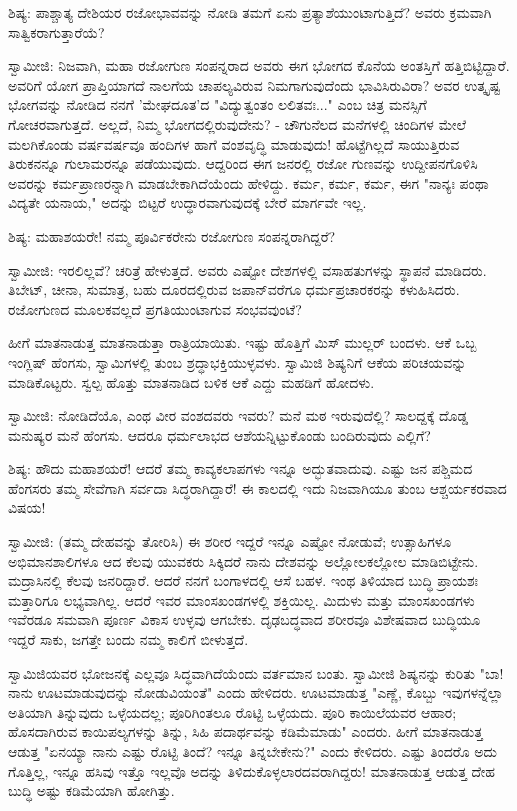 ಶಿಷ್ಯ: ಪಾಶ್ಚಾತ್ಯ ದೇಶಿಯರ ರಜೋಭಾವವನ್ನು ನೋಡಿ ತಮಗೆ ಏನು ಪ್ರತ್ಯಾಶೆಯುಂಟಾಗುತ್ತಿದೆ? ಅವರು ಕ್ರಮವಾಗಿ ಸಾತ್ವಿಕರಾಗುತ್ತಾರೆಯೆ?

ಸ್ವಾಮೀಜಿ: ನಿಜವಾಗಿ, ಮಹಾ ರಜೋಗುಣ ಸಂಪನ್ನರಾದ ಅವರು ಈಗ ಭೋಗದ ಕೊನೆಯ ಅಂತಸ್ತಿಗೆ ಹತ್ತಿಬಿಟ್ಟಿದ್ದಾರೆ. ಅವರಿಗೆ ಯೋಗ ಪ್ರಾಪ್ತಿಯಾಗದೆ ನಾಲಗೆಯ ಚಾಪಲ್ಯವಿರುವ ನಿಮಗಾಗುವುದೆಂದು ಭಾವಿಸಿರುವಿರಾ? ಅವರ ಉತ್ಕೃಷ್ಟ ಭೋಗವನ್ನು ನೋಡಿದ ನನಗೆ 'ಮೇಘದೂತ'ದ "ವಿದ್ಯುತ್ವಂತಂ ಲಲಿತವಃ..." ಎಂಬ ಚಿತ್ರ ಮನಸ್ಸಿಗೆ ಗೋಚರವಾಗುತ್ತದೆ. ಅಲ್ಲದೆ, ನಿಮ್ಮ ಭೋಗದಲ್ಲಿರುವುದೇನು? - ಚೌಗುನೆಲದ ಮನೆಗಳಲ್ಲಿ ಚಿಂದಿಗಳ ಮೇಲೆ ಮಲಗಿಕೊಂಡು ವರ್ಷವರ್ಷವೂ ಹಂದಿಗಳ ಹಾಗೆ ವಂಶವೃದ್ಧಿ ಮಾಡುವುದು! ಹೊಟ್ಟೆಗಿಲ್ಲದೆ ಸಾಯುತ್ತಿರುವ ತಿರುಕನನ್ನೂ ಗುಲಾಮರನ್ನೂ ಪಡೆಯುವುದು. ಆದ್ದರಿಂದ ಈಗ ಜನರಲ್ಲಿ ರಜೋ ಗುಣವನ್ನು ಉದ್ದೀಪನಗೊಳಿಸಿ ಅವರನ್ನು ಕರ್ಮಪ್ರಾಣರನ್ನಾಗಿ ಮಾಡಬೇಕಾಗಿದೆಯೆಂದು ಹೇಳಿದ್ದು. ಕರ್ಮ, ಕರ್ಮ, ಕರ್ಮ, ಈಗ "ನಾನ್ಯಃ ಪಂಥಾ ವಿದ್ಯತೇ ಯನಾಯ," ಅದನ್ನು ಬಿಟ್ಟರೆ ಉದ್ಧಾರವಾಗುವುದಕ್ಕೆ ಬೇರೆ ಮಾರ್ಗವೇ ಇಲ್ಲ.

ಶಿಷ್ಯ: ಮಹಾಶಯರೇ! ನಮ್ಮ ಪೂರ್ವಿಕರೇನು ರಜೋಗುಣ ಸಂಪನ್ನರಾಗಿದ್ದರೆ?

ಸ್ವಾಮೀಜಿ: ಇರಲಿಲ್ಲವೆ? ಚರಿತ್ರೆ ಹೇಳುತ್ತದೆ. ಅವರು ಎಷ್ಟೋ ದೇಶಗಳಲ್ಲಿ ವಸಾಹತುಗಳನ್ನು ಸ್ಥಾಪನೆ ಮಾಡಿದರು. ತಿಬೇಟ್, ಚೀನಾ, ಸುಮಾತ್ರ, ಬಹು ದೂರದಲ್ಲಿರುವ ಜಪಾನ್‌ವರೆಗೂ ಧರ್ಮಪ್ರಚಾರಕರನ್ನು ಕಳುಹಿಸಿದರು. ರಜೋಗುಣದ ಮೂಲಕವಲ್ಲದೆ ಪ್ರಗತಿಯುಂಟಾಗುವ ಸಂಭವವುಂಟೆ?

ಹೀಗೆ ಮಾತನಾಡುತ್ತ ಮಾತನಾಡುತ್ತಾ ರಾತ್ರಿಯಾಯಿತು. ಇಷ್ಟು ಹೊತ್ತಿಗೆ ಮಿಸ್ ಮುಲ್ಲರ್ ಬಂದಳು. ಆಕೆ ಒಬ್ಬ ಇಂಗ್ಲಿಷ್ ಹೆಂಗಸು, ಸ್ವಾಮಿಗಳಲ್ಲಿ ತುಂಬ ಶ್ರದ್ಧಾಭಕ್ತಿಯುಳ್ಳವಳು. ಸ್ವಾಮಿಜಿ ಶಿಷ್ಯನಿಗೆ ಆಕೆಯ ಪರಿಚಯವನ್ನು ಮಾಡಿಕೊಟ್ಟರು. ಸ್ವಲ್ಪ ಹೊತ್ತು ಮಾತನಾಡಿದ ಬಳಿಕ ಆಕೆ ಎದ್ದು ಮಹಡಿಗೆ ಹೋದಳು.

ಸ್ವಾಮೀಜಿ: ನೋಡಿದೆಯೊ, ಎಂಥ ವೀರ ವಂಶದವರು ಇವರು? ಮನೆ ಮಠ ಇರುವುದೆಲ್ಲಿ? ಸಾಲದ್ದಕ್ಕೆ ದೊಡ್ಡ ಮನುಷ್ಯರ ಮನೆ ಹೆಂಗಸು. ಆದರೂ ಧರ್ಮಲಾಭದ ಆಶೆಯನ್ನಿಟ್ಟುಕೊಂಡು ಬಂದಿರುವುದು ಎಲ್ಲಿಗೆ?

ಶಿಷ್ಯ: ಹೌದು ಮಹಾಶಯರೆ! ಆದರೆ ತಮ್ಮ ಕಾವ್ಯಕಲಾಪಗಳು ಇನ್ನೂ ಅದ್ಭುತವಾದುವು. ಎಷ್ಟು ಜನ ಪಶ್ಚಿಮದ ಹೆಂಗಸರು ತಮ್ಮ ಸೇವೆಗಾಗಿ ಸರ್ವದಾ ಸಿದ್ಧರಾಗಿದ್ದಾರೆ! ಈ ಕಾಲದಲ್ಲಿ ಇದು ನಿಜವಾಗಿಯೂ ತುಂಬ ಆಶ್ಚರ್ಯಕರವಾದ ವಿಷಯ!

ಸ್ವಾಮೀಜಿ: (ತಮ್ಮ ದೇಹವನ್ನು ತೋರಿಸಿ) ಈ ಶರೀರ ಇದ್ದರೆ ಇನ್ನೂ ಎಷ್ಟೋ ನೋಡುವೆ; ಉತ್ಸಾಹಿಗಳೂ ಅಭಿಮಾನಶಾಲಿಗಳೂ ಆದ ಕೆಲವು ಯುವಕರು ಸಿಕ್ಕಿದರೆ ನಾನು ದೇಶವನ್ನು ಅಲ್ಲೋಲಕಲ್ಲೋಲ ಮಾಡಿಬಿಟ್ಟೇನು. ಮದ್ರಾಸಿನಲ್ಲಿ ಕೆಲವು ಜನರಿದ್ದಾರೆ. ಆದರೆ ನನಗೆ ಬಂಗಾಳದಲ್ಲಿ ಆಸೆ ಬಹಳ. ಇಂಥ ತಿಳಿಯಾದ ಬುದ್ಧಿ ಪ್ರಾಯಶಃ ಮತ್ತಾರಿಗೂ ಲಭ್ಯವಾಗಿಲ್ಲ. ಆದರೆ ಇವರ ಮಾಂಸಖಂಡಗಳಲ್ಲಿ ಶಕ್ತಿಯಿಲ್ಲ. ಮಿದುಳು ಮತ್ತು ಮಾಂಸಖಂಡಗಳು ಇವೆರಡೂ ಸಮವಾಗಿ ಪೂರ್ಣ ವಿಕಾಸ ಉಳ್ಳವು ಆಗಬೇಕು. ದೃಢಬದ್ಧವಾದ ಶರೀರವೂ ವಿಶೇಷವಾದ ಬುದ್ಧಿಯೂ ಇದ್ದರೆ ಸಾಕು, ಜಗತ್ತೇ ಬಂದು ನಮ್ಮ ಕಾಲಿಗೆ ಬೀಳುತ್ತದೆ.

ಸ್ವಾಮಿಜಿಯವರ ಭೋಜನಕ್ಕೆ ಎಲ್ಲವೂ ಸಿದ್ಧವಾಗಿದೆಯೆಂದು ವರ್ತಮಾನ ಬಂತು. ಸ್ವಾಮೀಜಿ ಶಿಷ್ಯನನ್ನು ಕುರಿತು "ಬಾ! ನಾನು ಊಟಮಾಡುವುದನ್ನು ನೋಡುವಿಯಂತೆ" ಎಂದು ಹೇಳಿದರು. ಊಟಮಾಡುತ್ತ "ಎಣ್ಣೆ, ಕೊಬ್ಬು ಇವುಗಳನ್ನೆಲ್ಲಾ ಅತಿಯಾಗಿ ತಿನ್ನುವುದು ಒಳ್ಳೆಯದಲ್ಲ; ಪೂರಿಗಿಂತಲೂ ರೊಟ್ಟಿ ಒಳ್ಳೆಯದು. ಪೂರಿ ಕಾಯಿಲೆಯವರ ಆಹಾರ; ಹೊಸದಾಗಿರುವ ಕಾಯಿಪಲ್ಯಗಳನ್ನು ತಿನ್ನು, ಸಿಹಿ ಪದಾರ್ಥವನ್ನು ಕಡಿಮೆಮಾಡು" ಎಂದರು. ಹೀಗೆ ಮಾತನಾಡುತ್ತ ಆಡುತ್ತ "ಏನಯ್ಯಾ ನಾನು ಎಷ್ಟು ರೊಟ್ಟಿ ತಿಂದೆ? ಇನ್ನೂ ತಿನ್ನಬೇಕೇನು?" ಎಂದು ಕೇಳಿದರು. ಎಷ್ಟು ತಿಂದರೊ ಅದು ಗೊತ್ತಿಲ್ಲ, ಇನ್ನೂ ಹಸಿವು ಇತ್ತೊ ಇಲ್ಲವೊ ಅದನ್ನು ತಿಳಿದುಕೊಳ್ಳಲಾರದವರಾಗಿದ್ದರು! ಮಾತನಾಡುತ್ತ ಆಡುತ್ತ ದೇಹ ಬುದ್ಧಿ ಅಷ್ಟು ಕಡಿಮೆಯಾಗಿ ಹೋಗಿತ್ತು.

